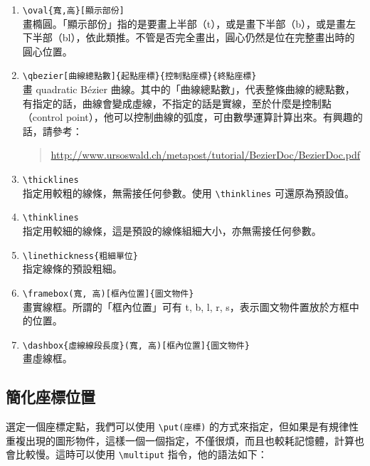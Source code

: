 \begin{enumerate}
  \item \verb|\oval{寬,高}[顯示部份]|\\
        畫橢圓。「顯示部份」指的是要畫上半部（{\ttfamily t}），或是畫下半部（{\ttfamily b}），或是畫左下半部（{\ttfamily bl}），依此類推。不管是否完全畫出，圓心仍然是位在完整畫出時的圓心位置。

  \item \verb|\qbezier[曲線總點數]{起點座標}{控制點座標}{終點座標}|\\
        畫 quadratic B\'{e}zier 曲線。其中的「曲線總點數」，代表整條曲線的總點數，有指定的話，曲線會變成虛線，不指定的話是實線，至於什麼是控制點（control point），他可以控制曲線的弧度，可由數學運算計算出來。有興趣的話，請參考：

        \begin{quote}
          \url{http://www.ursoswald.ch/metapost/tutorial/BezierDoc/BezierDoc.pdf}
        \end{quote}

  \item \verb|\thicklines|\\
        指定用較粗的線條，無需接任何參數。使用 \verb|\thinklines| 可還原為預設值。

  \item \verb|\thinklines|\\
        指定用較細的線條，這是預設的線條組細大小，亦無需接任何參數。

  \item \verb|\linethickness{粗細單位}|\\
        指定線條的預設粗細。

  \item \verb|\framebox(寬, 高)[框內位置]{圖文物件}|\\
        畫實線框。所謂的「框內位置」可有 {\ttfamily t, b, l, r, s}，表示圖文物件置放於方框中的位置。

  \item \verb|\dashbox{虛線線段長度}(寬, 高)[框內位置]{圖文物件}|\\
        畫虛線框。
\end{enumerate}

\subsection{簡化座標位置}

選定一個座標定點，我們可以使用 \verb|\put(座標)| 的方式來指定，但如果是有規律性重複出現的圖形物件，這樣一個一個指定，不僅很煩，而且也較耗記憶體，計算也會比較慢。這時可以使用 \verb|\multiput| 指令，他的語法如下：

